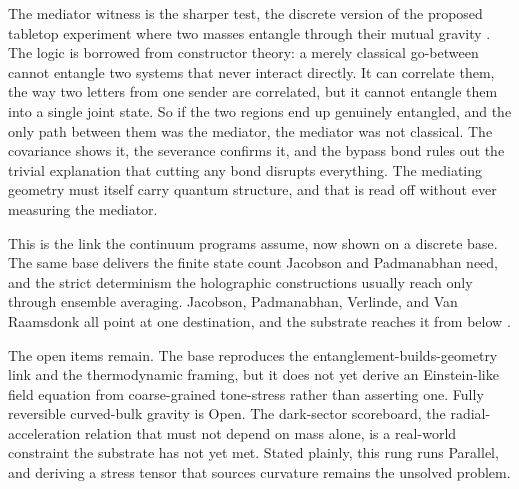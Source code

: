 The mediator witness is the sharper test, the discrete version of the proposed
tabletop experiment where two masses entangle through their mutual gravity
\cite{marletto2017, bose2017}. The logic is borrowed from constructor theory: a
merely classical go-between cannot entangle two systems that never interact
directly. It can correlate them, the way two letters from one sender are
correlated, but it cannot entangle them into a single joint state. So if the two regions
end up genuinely entangled, and the only path between them was the mediator, the
mediator was not classical. The covariance shows it, the severance confirms it,
and the bypass bond rules out the trivial explanation that cutting any bond
disrupts everything. The mediating geometry must itself carry quantum
structure, and that is read off without ever measuring the mediator.

This is the link the continuum programs assume, now shown on a discrete base. The
same base delivers the finite state count Jacobson and Padmanabhan need, and the
strict determinism the holographic constructions usually reach only through
ensemble averaging. Jacobson, Padmanabhan, Verlinde, and Van Raamsdonk all point
at one destination, and the substrate reaches it from below
\cite{cluesurf2026repo}.

The open items remain. The base reproduces the
entanglement-builds-geometry link and the thermodynamic framing, but it does not
yet derive an Einstein-like field equation from coarse-grained tone-stress rather
than asserting one. Fully reversible curved-bulk gravity is Open. The dark-sector
scoreboard, the radial-acceleration relation that must not depend on mass alone,
is a real-world constraint the substrate has not yet met. Stated plainly,
this rung runs Parallel, and deriving a stress tensor that sources curvature
remains the unsolved problem.

